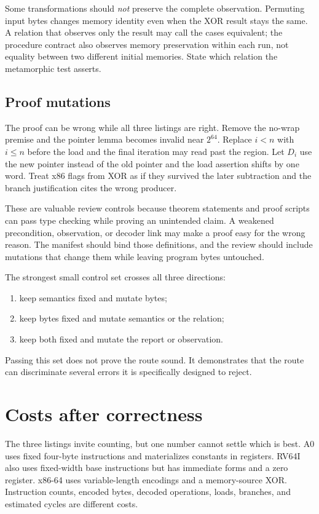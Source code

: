 Some transformations should \emph{not} preserve the complete observation.
Permuting input bytes changes memory identity even when the XOR result stays
the same. A relation that observes only the result may call the cases
equivalent; the procedure contract also observes memory preservation within
each run, not equality between two different initial memories. State which
relation the metamorphic test asserts.

\subsection{Proof mutations}

The proof can be wrong while all three listings are right. Remove the
no-wrap premise and the pointer lemma becomes invalid near \(2^{64}\). Replace
\(i<n\) with \(i\le n\) before the load and the final iteration may read past
the region. Let \(D_i\) use the new pointer instead of the old pointer and the
load assertion shifts by one word. Treat x86 flags from XOR as if they survived
the later subtraction and the branch justification cites the wrong producer.

These are valuable review controls because theorem statements and proof
scripts can pass type checking while proving an unintended claim. A weakened
precondition, observation, or decoder link may make a proof easy for the wrong
reason. The manifest should bind those definitions, and the review should
include mutations that change them while leaving program bytes untouched.

The strongest small control set crosses all three directions:

\begin{enumerate}
\item keep semantics fixed and mutate bytes;
\item keep bytes fixed and mutate semantics or the relation;
\item keep both fixed and mutate the report or observation.
\end{enumerate}

Passing this set does not prove the route sound. It demonstrates that the
route can discriminate several errors it is specifically designed to reject.

\section{Costs after correctness}

The three listings invite counting, but one number cannot settle which is
best. A0 uses fixed four-byte instructions and materializes constants in
registers. RV64I also uses fixed-width base instructions but has immediate
forms and a zero register. x86-64 uses variable-length encodings and a
memory-source XOR. Instruction counts, encoded bytes, decoded operations,
loads, branches, and estimated cycles are different costs.

